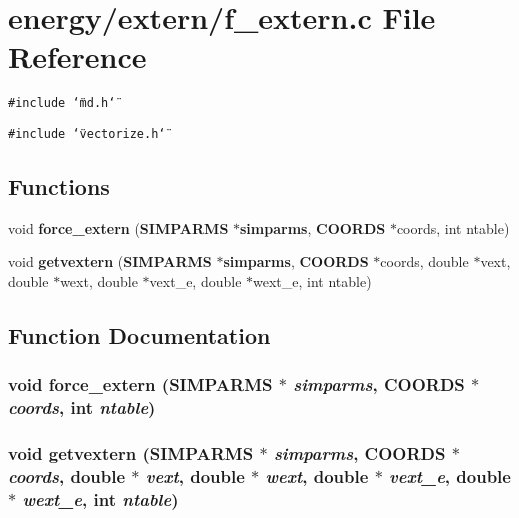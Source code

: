 \section{energy/extern/f\_\-extern.c File Reference}
\label{f__extern_8c}
{\tt \#include \char`\"{}md.h\char`\"{}}\par
{\tt \#include \char`\"{}vectorize.h\char`\"{}}\par
\subsection*{Functions}
\begin{CompactItemize}
\item 
void {\bf force\_\-extern} ({\bf SIMPARMS} $\ast${\bf simparms}, {\bf COORDS} $\ast$coords, int ntable)
\item 
void {\bf getvextern} ({\bf SIMPARMS} $\ast${\bf simparms}, {\bf COORDS} $\ast$coords, double $\ast$vext, double $\ast$wext, double $\ast$vext\_\-e, double $\ast$wext\_\-e, int ntable)
\end{CompactItemize}


\subsection{Function Documentation}
\subsubsection{\setlength{\rightskip}{0pt plus 5cm}void force\_\-extern ({\bf SIMPARMS} $\ast$ {\em simparms}, {\bf COORDS} $\ast$ {\em coords}, int {\em ntable})}\label{f__extern_8c_493a6ad4ab21c349ee1a827541da3362}


\subsubsection{\setlength{\rightskip}{0pt plus 5cm}void getvextern ({\bf SIMPARMS} $\ast$ {\em simparms}, {\bf COORDS} $\ast$ {\em coords}, double $\ast$ {\em vext}, double $\ast$ {\em wext}, double $\ast$ {\em vext\_\-e}, double $\ast$ {\em wext\_\-e}, int {\em ntable})}\label{f__extern_8c_a841c367a1828955c0a1a0e107df7b4b}


